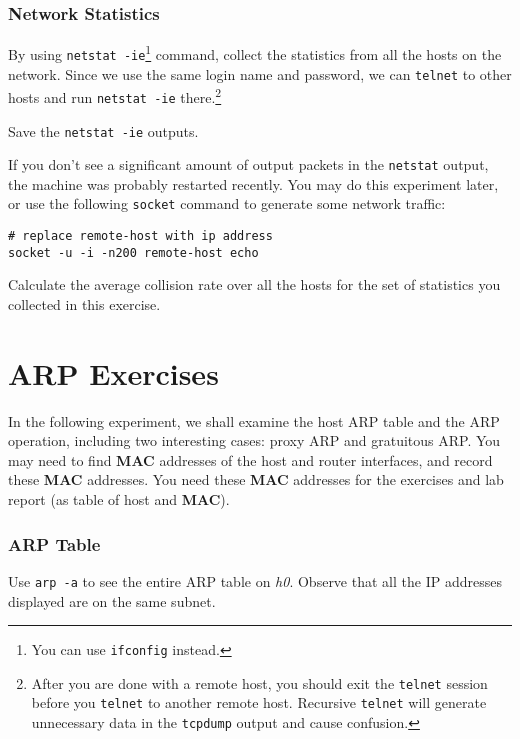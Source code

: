 \documentclass{../UTNetLab}
\begin{document}
\section{Network Statistics}
    By using \lstinline{netstat -ie}\footnote{You can use \lstinline{ifconfig} instead.} command, collect the statistics from all the hosts on the network.
    Since we use the same login name and password, we can \lstinline{telnet} to other hosts and run \lstinline{netstat -ie} there.\footnote{%
    After you are done with a remote host, you should exit the \lstinline{telnet} session before you \lstinline{telnet} to another remote host.
    Recursive \lstinline{telnet} will generate unnecessary data in the \lstinline{tcpdump} output and cause confusion.
    }

    Save the \lstinline{netstat -ie} outputs.

    If you don’t see a significant amount of output packets in the \lstinline{netstat} output, the machine was probably restarted recently.
    You may do this experiment later, or use the following \lstinline{socket} command to generate some network traffic:
    \begin{lstlisting}[emph={remote-host},morekeywords={[3]echo}]
# replace remote-host with ip address
socket -u -i -n200 remote-host echo
    \end{lstlisting}
    
    \begin{report}
        \item Calculate the average collision rate over all the hosts for the set of statistics you collected in this exercise.
    \end{report}

\part{ARP Exercises}
    In the following experiment, we shall examine the host ARP table and the ARP operation, including two interesting cases: proxy ARP and gratuitous ARP.
    You may need to find \textbf{MAC} addresses of the host and router interfaces, and record these \textbf{MAC} addresses.
    You need these \textbf{MAC} addresses for the exercises and lab report (as table of host and \textbf{MAC}).

\section{ARP Table}
    Use \lstinline{arp -a} to see the entire ARP table on \textit{h0}.
    Observe that all the IP addresses displayed are on the same subnet.
\end{document}

